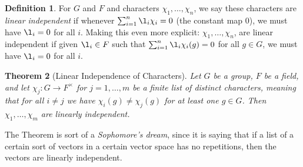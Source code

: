 \documentclass[12pt]{report}
\newtheorem{theorem}{Theorem}[chapter]
\numberwithin{equation}{section}
\numberwithin{theorem}{chapter}
\theoremstyle{definition}
\newtheorem{definition}[theorem]{Definition}
\newtheorem*{basic properties}{Basic Properties}
\newtheorem*{Important Remark}{Important Remark}
\begin{document}
\begin{definition}
For $G$ and $F$ and characters $\chi_1, \dots, \chi_n$, we say these
characters are {\em linear independent} if whenever
$\sum_{i=1}^n \l_i \chi_i=0$  (the constant map $0$), we must have $\l_i
= 0$ for all $i$. Making this even more explicit:
$\chi_1, \dots, \chi_n$,
are linear independent if given $\l_i \in F$ such that $\sum_{i=1}^n \l_i
\chi_i(g) = 0$ for all $g \in G$, we must have $\l_i = 0$ for all $i$.
\end{definition}




\begin{theorem}[Linear Independence of Characters]\label{linear independence of characters}
Let $G$ be a group, $F$ be a field, and let $\chi_j: G \to F^{\times}$ for $j = 1, \dots, m$ be a finite list of distinct characters, meaning that for all $i \neq j$ we have $\chi_i(g) \neq \chi_j(g)$ for at least one $g \in G$. Then $\chi_1, \dots, \chi_m$ are linearly independent.
\end{theorem}

The Theorem is sort of a \emph{Sophomore's dream}, since it is saying that if a list of a certain sort of vectors in a certain vector space has no repetitions, then the vectors are linearly independent.
\end{document}
